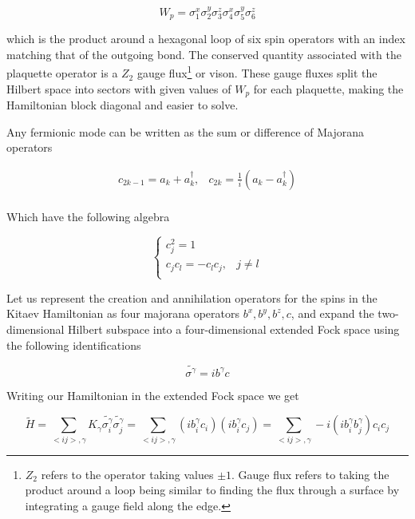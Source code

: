 \begin{equation}
W_{p} = \sigma_{1}^{x}\sigma_{2}^{y}\sigma_{3}^{z}\sigma_{4}^{x}\sigma_{5}^{y}\sigma_{6}^{z}
\end{equation}

which is the product around a hexagonal loop of six spin operators with an index matching that of the outgoing bond. The conserved quantity associated with the plaquette operator is a $Z_{2}$ gauge flux\footnote{$Z_{2}$ refers to the operator taking values $\pm 1$. Gauge flux refers to taking the product around a loop being similar to finding the flux through a surface by integrating a gauge field along the edge.} or vison. These gauge fluxes split the Hilbert space into sectors with given values of $W_{p}$ for each plaquette, making the Hamiltonian block diagonal and easier to solve.

Any fermionic mode can be written as the sum or difference of Majorana operators

\begin{equation}
\begin{array}{cc}
	c_{2k-1} = a_{k} + a_{k}^{\dagger}, & c_{2k} = \frac{1}{i} (a_{k} - a_{k}^{\dagger}) \\
\end{array}
\end{equation}

Which have the following algebra

\begin{equation}
\begin{cases}
	c_{j}^{2} = 1 \\
	c_{j} c_{l} = - c_{l} c_{j}, & j \neq l \\
\end{cases}
\end{equation}

Let us represent the creation and annihilation operators for the spins in the Kitaev Hamiltonian as four majorana operators $b^{x}, b^{y}, b^{z}, c$, and expand the two-dimensional Hilbert subspace into a four-dimensional extended Fock space using the following identifications

\begin{equation}
\widetilde{\sigma^{\gamma}} = i b^{\gamma} c
\end{equation}

Writing our Hamiltonian in the extended Fock space we get

\begin{equation}
\widetilde{H} = \sum_{<ij>,\gamma} K_{\gamma} \widetilde{\sigma^{\gamma}_{i}}\widetilde{\sigma^{\gamma}_{j}} = \sum_{<ij>,\gamma} (i b^{\gamma}_{i}c_{i}) (i b^{\gamma}_{i}c_{j}) = \sum_{<ij>,\gamma} -i(ib^{\gamma}_{i}b^{\gamma}_{j})c_{i}c_{j}
\end{equation}

